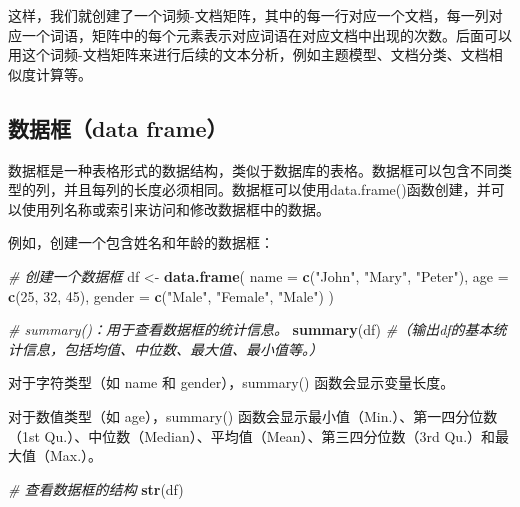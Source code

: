 \documentclass[]{book}
\newenvironment{Shaded}{\begin{snugshade}}{\end{snugshade}}
\newcommand{\CommentTok}[1]{\textcolor[rgb]{0.56,0.35,0.01}{\textit{#1}}}
\newcommand{\DataTypeTok}[1]{\textcolor[rgb]{0.13,0.29,0.53}{#1}}
\newcommand{\DecValTok}[1]{\textcolor[rgb]{0.00,0.00,0.81}{#1}}
\newcommand{\KeywordTok}[1]{\textcolor[rgb]{0.13,0.29,0.53}{\textbf{#1}}}
\newcommand{\NormalTok}[1]{#1}
\newcommand{\StringTok}[1]{\textcolor[rgb]{0.31,0.60,0.02}{#1}}
\begin{document}
这样，我们就创建了一个词频-文档矩阵，其中的每一行对应一个文档，每一列对应一个词语，矩阵中的每个元素表示对应词语在对应文档中出现的次数。后面可以用这个词频-文档矩阵来进行后续的文本分析，例如主题模型、文档分类、文档相似度计算等。

\hypertarget{ux6570ux636eux6846data-frame}{%
\subsection{数据框（data frame）}\label{ux6570ux636eux6846data-frame}}

数据框是一种表格形式的数据结构，类似于数据库的表格。数据框可以包含不同类型的列，并且每列的长度必须相同。数据框可以使用data.frame()函数创建，并可以使用列名称或索引来访问和修改数据框中的数据。

例如，创建一个包含姓名和年龄的数据框：

\begin{Shaded}
\begin{Highlighting}[]
\CommentTok{# 创建一个数据框}
\NormalTok{df <-}\StringTok{ }\KeywordTok{data.frame}\NormalTok{(}
  \DataTypeTok{name =} \KeywordTok{c}\NormalTok{(}\StringTok{"John"}\NormalTok{, }\StringTok{"Mary"}\NormalTok{, }\StringTok{"Peter"}\NormalTok{),}
  \DataTypeTok{age =} \KeywordTok{c}\NormalTok{(}\DecValTok{25}\NormalTok{, }\DecValTok{32}\NormalTok{, }\DecValTok{45}\NormalTok{),}
  \DataTypeTok{gender =} \KeywordTok{c}\NormalTok{(}\StringTok{"Male"}\NormalTok{, }\StringTok{"Female"}\NormalTok{, }\StringTok{"Male"}\NormalTok{)}
\NormalTok{)}
\end{Highlighting}
\end{Shaded}

\begin{Shaded}
\begin{Highlighting}[]
\CommentTok{# summary()：用于查看数据框的统计信息。}
\KeywordTok{summary}\NormalTok{(df) }\CommentTok{#（输出df的基本统计信息，包括均值、中位数、最大值、最小值等。）}
\end{Highlighting}
\end{Shaded}

对于字符类型（如 name 和 gender），summary() 函数会显示变量长度。

对于数值类型（如 age），summary() 函数会显示最小值（Min.）、第一四分位数（1st Qu.）、中位数（Median）、平均值（Mean）、第三四分位数（3rd Qu.）和最大值（Max.）。

\begin{Shaded}
\begin{Highlighting}[]
\CommentTok{# 查看数据框的结构}
\KeywordTok{str}\NormalTok{(df)}
\end{Highlighting}
\end{Shaded}
\end{document}
